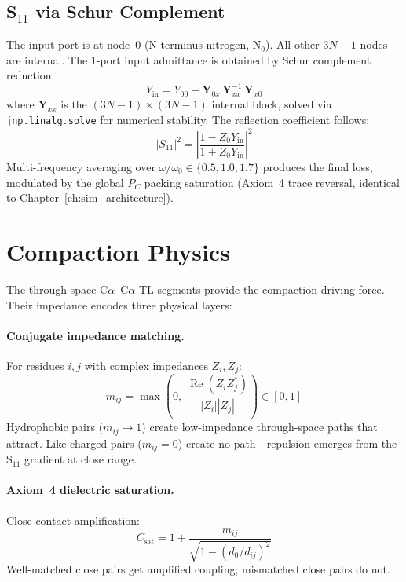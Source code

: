 \subsection{S$_{11}$ via Schur Complement}
\label{sec:schur}

The input port is at node~0 (N-terminus nitrogen, N$_0$).
All other $3N-1$ nodes are internal.
The 1-port input admittance is obtained by Schur complement reduction:
\begin{equation}
    Y_\text{in} = Y_{00} - \mathbf{Y}_{0x} \, \mathbf{Y}_{xx}^{-1} \, \mathbf{Y}_{x0}
    \label{eq:schur}
\end{equation}
where $\mathbf{Y}_{xx}$ is the $(3N-1) \times (3N-1)$ internal block, solved via \texttt{jnp.linalg.solve} for numerical stability.
The reflection coefficient follows:
\begin{equation}
    |S_{11}|^2 = \left| \frac{1 - Z_0 Y_\text{in}}{1 + Z_0 Y_\text{in}} \right|^2
    \label{eq:s11_network}
\end{equation}
Multi-frequency averaging over $\omega/\omega_0 \in \{0.5, 1.0, 1.7\}$ produces the final loss, modulated by the global $P_C$ packing saturation (Axiom~4 trace reversal, identical to Chapter~\ref{ch:sim_architecture}).

\section{Compaction Physics}
\label{sec:compaction}

The through-space C$\alpha$--C$\alpha$ TL segments provide the compaction driving force.
Their impedance encodes three physical layers:

\paragraph{Conjugate impedance matching.}
For residues $i, j$ with complex impedances $Z_i, Z_j$:
\begin{equation}
    m_{ij} = \max\!\left(0,\; \frac{\operatorname{Re}(Z_i Z_j^*)}{|Z_i||Z_j|}\right) \in [0, 1]
    \label{eq:conj_match}
\end{equation}
Hydrophobic pairs ($m_{ij} \to 1$) create low-impedance through-space paths that attract.
Like-charged pairs ($m_{ij} = 0$) create no path---repulsion emerges from the S$_{11}$ gradient at close range.

\paragraph{Axiom~4 dielectric saturation.}
Close-contact amplification:
\begin{equation}
    C_\text{sat} = 1 + \frac{m_{ij}}{\sqrt{1 - (d_0/d_{ij})^2}}
    \label{eq:c_sat_network}
\end{equation}
Well-matched close pairs get amplified coupling; mismatched close pairs do not.

